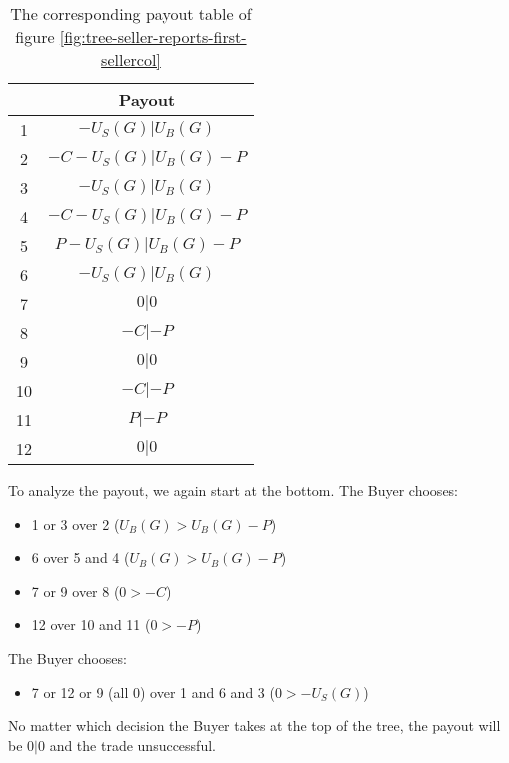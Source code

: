 \documentclass{cacthesis}
\begin{document}
\newpage
\begin{table}[htb!]
\centering
    \begin{tabular}{ |c|c| }
    \hline
    & Payout  \\
    \hline
    \hline
    1& $-U_S(G)| U_B(G)$\\
    \hline
    2& $-C-U_S(G)|U_B(G) -P$\\
    \hline
    3&$-U_S(G)|U_B(G)$ \\
    \hline
    4& $-C-U_S(G)|U_B(G)-P$ \\
    \hline
    5& $P-U_S(G)| U_B(G) - P$\\
    \hline 
    6& $-U_S(G)|U_B(G)$\\
    \hline
    7& $0|0$\\
    \hline
    8& $-C | -P$\\
    \hline
    9& $0|0$\\
    \hline
    10& $-C|-P$\\
    \hline
    11& $P| -P$\\
    \hline
    12& $0| 0$\\
    \hline
    \end{tabular}
\caption{The corresponding payout table of figure \ref{fig:tree-seller-reports-first-sellercol}}
\end{table}

To analyze the payout, we again start at the bottom. The Buyer chooses:
\begin{itemize}
    \item 1 or 3 over 2 ($U_B(G) > U_B(G) - P$)
    \item 6 over 5 and 4  ($U_B(G) > U_B(G) - P$)
    \item 7 or 9 over 8 ($0 > -C$)
    \item 12 over 10 and 11 ($0 > -P$)
\end{itemize}
The Buyer chooses:
\begin{itemize}
    \item 7 or 12 or 9 (all 0) over 1 and 6 and 3  ($0>-U_S(G)$)
\end{itemize}

No matter which decision the Buyer takes at the top of the tree, the payout will be $0|0$ and the trade unsuccessful.
\newpage
\end{document}

